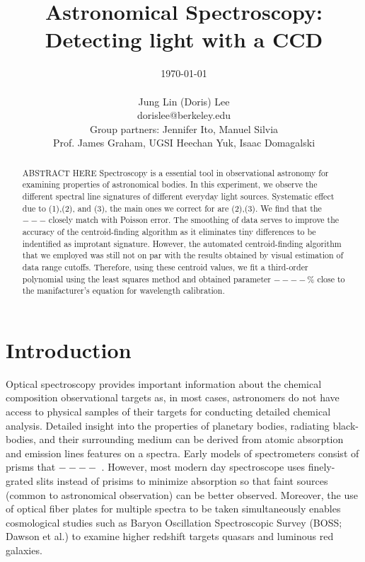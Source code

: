 \documentclass[authoryear, 12pt,5p, times]{elsarticle}
\begin{document}
\begin{frontmatter}
\title{Astronomical Spectroscopy: Detecting light with a CCD}
\author{\today \\ \quad \\Jung Lin (Doris) Lee\\ dorislee@berkeley.edu\\Group partners: Jennifer Ito, Manuel Silvia\\Prof. James Graham, UGSI Heechan Yuk, Isaac Domagalski}
	\begin{abstract}
	ABSTRACT HERE
	Spectroscopy is a essential tool in observational astronomy for examining  properties of astronomical bodies. In this experiment, we observe the different spectral line signatures of different everyday light sources. Systematic effect due to (1),(2), and (3), the main ones we correct for are (2),(3). We find that the  $---$ closely match with Poisson error. The smoothing of data serves to improve the accuracy of the centroid-finding algorithm as it eliminates tiny differences to be indentified as improtant signature. However, the automated centroid-finding algorithm that we employed was still not on par with the results obtained by visual estimation of data range cutoffs. Therefore, using these centroid values, we fit a third-order polynomial using the least squares method and obtained parameter $----$\% close to the manifacturer's equation for wavelength calibration.
  
	\end{abstract}
\end{frontmatter}
\section{Introduction\label{intro}}
Optical spectroscopy provides important information about the chemical composition observational targets as, in most cases, astronomers do not have access to physical samples of their targets for conducting detailed chemical analysis. Detailed insight into the properties of planetary bodies, radiating black-bodies, and their  surrounding medium can be derived from atomic absorption and emission lines features on a spectra.
Early models of spectrometers consist of prisms that $----$ . However, most modern day spectroscope uses finely-grated slits instead of prisims to minimize absorption so that faint sources (common to astronomical observation) can be better observed. Moreover, the use of optical fiber plates for multiple spectra to be taken simultaneously enables cosmological studies such as Baryon Oscillation Spectroscopic Survey (BOSS; Dawson et al.) to examine higher redshift targets quasars and luminous red galaxies.
\end{document}

